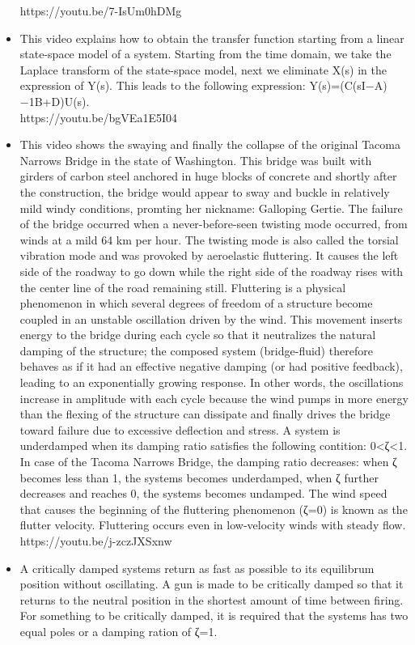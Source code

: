 \documentclass{document}
\begin{document}
\begin{itemize}
			https://youtu.be/7-IsUm0hDMg
			\item This video explains how to obtain the transfer function starting from a linear state-space model of a system. Starting from the time domain, we take the Laplace transform of the state-space model, next we eliminate X(s) in the expression of Y(s). This leads to the following expression: Y(s)=(C(sI−A)−1B+D)U(s).\\
			https://youtu.be/bgVEa1E5I04
			\item This video shows the swaying and finally the collapse of the original Tacoma Narrows Bridge in the state of Washington. This bridge was built with girders of carbon steel anchored in huge blocks of concrete and shortly after the construction, the bridge would appear to sway and buckle in relatively mild windy conditions, promting her nickname: Galloping Gertie. The failure of the bridge occurred when a never-before-seen twisting mode occurred, from winds at a mild 64 km per hour. The twisting mode is also called the torsial vibration mode and was provoked by aeroelastic fluttering. It causes the left side of the roadway to go down while the right side of the roadway rises with the center line of the road remaining still. 
			Fluttering is a physical phenomenon in which several degrees of freedom of a structure become coupled in an unstable oscillation driven by the wind. This movement inserts energy to the bridge during each cycle so that it neutralizes the natural damping of the structure; the composed system (bridge-fluid) therefore behaves as if it had an effective negative damping (or had positive feedback), leading to an exponentially growing response. In other words, the oscillations increase in amplitude with each cycle because the wind pumps in more energy than the flexing of the structure can dissipate and finally drives the bridge toward failure due to excessive deflection and stress. 
			A system is underdamped when its damping ratio satisfies the following contition: 0<ζ<1. In case of the Tacoma Narrows Bridge, the damping ratio decreases: when ζ becomes less than 1, the systems becomes underdamped, when ζ further decreases and reaches 0, the systems becomes undamped. The wind speed that causes the beginning of the fluttering phenomenon (ζ=0) is known as the flutter velocity. Fluttering occurs even in low-velocity winds with steady flow.\\
			https://youtu.be/j-zczJXSxnw
			\item A critically damped systems return as fast as possible to its equilibrum position without oscillating. A gun is made to be critically damped so that it returns to the neutral position in the shortest amount of time between firing. For something to be critically damped, it is required that the systems has two equal poles or a damping ration of ζ=1. \\

\end{itemize}
\end{document}
